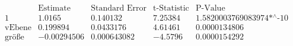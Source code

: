 \[\begin{array}{l|llll}
 \text{} & \text{Estimate} & \text{Standard Error} & \text{t-Statistic} & \text{P-Value} \\
\hline
 1 & 1.0165 & 0.140132 & 7.25384 & \text{1.5820003769083974$\grave{ }$*${}^{\wedge}$-10} \\
 \text{vEbene} & 0.199894 & 0.0433176 & 4.61461 & 0.0000134806 \\
 \text{gr{\" o}{\ss}e} & -0.00294506 & 0.000643082 & -4.5796 & 0.0000154292 \\
\end{array}\]

